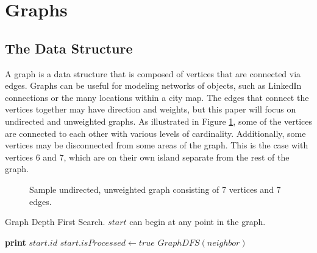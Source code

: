 \documentclass[letterpaper, 10pt,DIV=13]{scrartcl}
\numberwithin{equation}{section} %
\numberwithin{figure}{section} %
\numberwithin{table}{section} %
\begin{document}
\section{Graphs}
\subsection{The Data Structure}
A graph is a data structure that is composed of vertices that are connected via edges. Graphs can be useful for modeling networks of objects, such as LinkedIn connections or the many locations within a city map. The edges that connect the vertices together may have direction and weights, but this paper will focus on undirected and unweighted graphs. As illustrated in Figure \ref{figure:graph}, some of the vertices are connected to each other with various levels of cardinality. Additionally, some vertices may be disconnected from some areas of the graph. This is the case with vertices 6 and 7, which are on their own island separate from the rest of the graph.

\begin{figure}
  \hspace*{\fill}
  \hspace*{\fill}
  \caption{Sample undirected, unweighted graph consisting of 7 vertices and 7 edges.}
  \label{figure:graph}
\end{figure}

\begin{algorithm}
  \caption{Graph Depth First Search. $start$ can begin at any point in the graph.}
  \label{algorithm:graphDfs}
  \begin{algorithmic}[1]
       
        \State \textbf{print} $start.id$
        \State $start.isProcessed \gets true$
      \EndIf
       
         
          \State $GraphDFS(neighbor)$
        \EndIf
      \EndFor
    \EndProcedure
  \end{algorithmic}
\end{algorithm}
\end{document}
